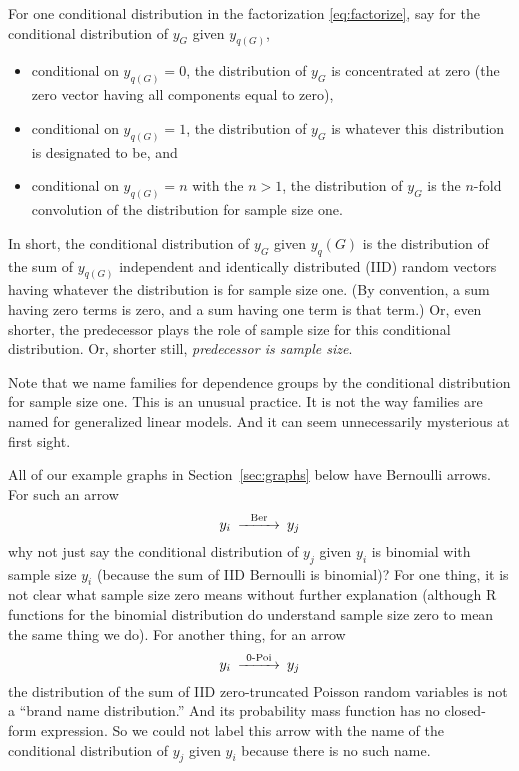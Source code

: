 For one conditional distribution in the factorization \eqref{eq:factorize},
say for the conditional distribution of $y_G$ given $y_{q(G)}$,
\begin{itemize}
\item conditional on $y_{q(G)} = 0$, the distribution of $y_G$ is concentrated
    at zero (the zero vector having all components equal to zero), 
\item conditional on $y_{q(G)} = 1$, the distribution of $y_G$ is whatever
    this distribution is designated to be, and
\item conditional on $y_{q(G)} = n$ with the $n > 1$, the distribution
    of $y_G$ is the $n$-fold convolution of the distribution for sample
    size one.
\end{itemize}
In short, the conditional distribution of $y_G$ given $y_q(G)$ is the
distribution of the sum of $y_{q(G)}$
independent and identically distributed (IID)
random vectors having whatever the distribution is for sample size one.
(By convention, a sum having zero terms is zero, and a sum having one term
is that term.)
Or, even shorter, the predecessor plays the role of sample size for this
conditional distribution.
Or, shorter still, \emph{predecessor is sample size}.

Note that we name families for dependence groups by the conditional
distribution for sample size one.
This is an unusual practice.  It is not the way families are named for
generalized linear models.
And it can seem unnecessarily mysterious at first sight.

All of our example graphs in Section~\ref{sec:graphs} below
have Bernoulli arrows.  For such an arrow
$$
\begin{CD}
   y_i @>\text{Ber}>> y_j
\end{CD}
$$
why not just say the conditional distribution of $y_j$ given $y_i$ is binomial
with sample size $y_i$ (because the sum of IID Bernoulli is binomial)?
For one thing,
it is not clear what sample size zero means without further explanation
(although R functions for the binomial distribution do understand sample
size zero to mean the same thing we do).
For another thing, for an arrow
$$
\begin{CD}
   y_i @>\text{0-Poi}>> y_j
\end{CD}
$$
the distribution of the sum of IID zero-truncated Poisson random variables
is not a ``brand name distribution.''  And its
probability mass function has no closed-form expression.
So we could not label this arrow with the name of the conditional distribution
of $y_j$ given $y_i$ because there is no such name.

